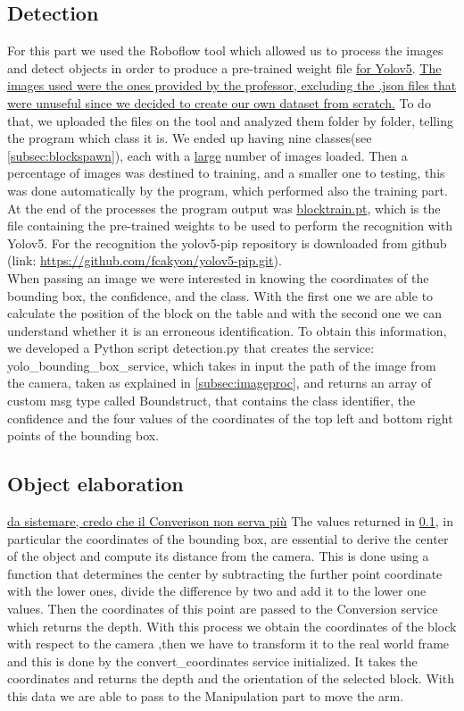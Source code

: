 \documentclass[12pt,a4paper]{article}
\begin{document}
\subsection{Detection}\label{subsec:detect}
For this part we used the Roboflow tool which allowed us to process the images and detect objects in order to produce a pre-trained weight file \uline{for Yolov5}. \uline{The images used were the ones provided by the professor, excluding the .json files that were unuseful since we decided to create our own dataset from scratch.} To do that, we uploaded the files on the tool and analyzed them folder by folder, telling the program which class it is. We ended up having nine classes(see \ref{subsec:blockspawn}), each with a \uline{large} number of images loaded. Then a percentage of images was destined to training, and a smaller one to testing, this was done automatically by the program, which performed also the training part. At the end of the processes the program output was \uline{blocktrain.pt}, which is the file containing the pre-trained weights to be used to perform the recognition with Yolov5. For the recognition the yolov5-pip repository is downloaded from github (link: \url{https://github.com/fcakyon/yolov5-pip.git}).\\
When passing an image we were interested in knowing the coordinates of the bounding box, the confidence, and the class. With the first one we are able to calculate the position of the block on the table and with the second one we can understand whether it is an erroneous identification. To obtain this information, we developed a Python script detection.py that creates the service: yolo\_bounding\_box\_service, which takes in input the path of the image from the camera, taken as explained in \ref{subsec:imageproc}, and returns an array of custom msg type called Boundstruct, that contains the class identifier, the confidence and the four values of the coordinates of the top left and bottom right points of the bounding box.

\subsection{Object elaboration}\label{subsec:objel}
\uline{da sistemare, credo che il Converison non serva più}
The values returned in \ref{subsec:detect}, in particular the coordinates of the bounding box, are essential to derive the center of the object and compute its distance from the camera. This is done using a function that determines the center by subtracting the further point coordinate with the lower ones, divide the difference by two and add it to the lower one values. Then the coordinates of this point are passed to the Conversion service which returns the depth. With this process we obtain the coordinates of the block with respect to the camera ,then we have to transform it to the real world frame and this is done by the convert\_coordinates service initialized. It takes the coordinates and returns the depth and the orientation of the selected block. With this data we are able to pass to the Manipulation part to move the arm.
\end{document}
